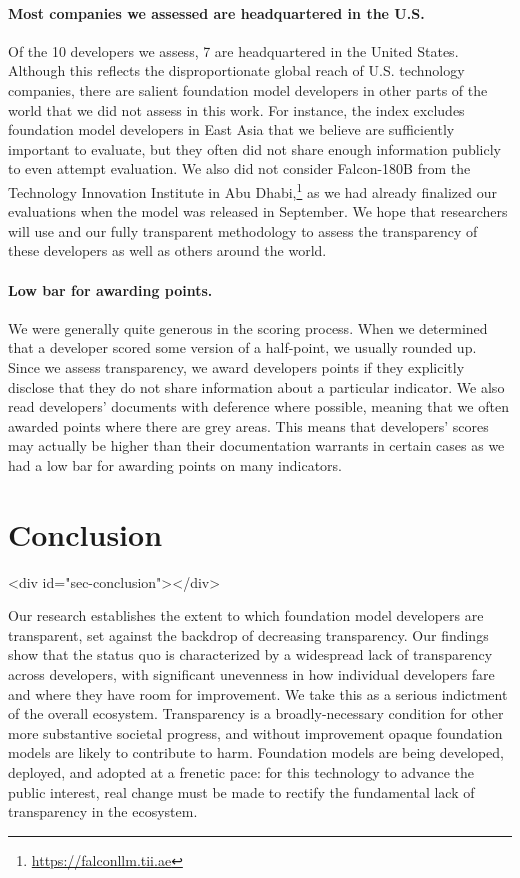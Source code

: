 \documentclass[screen, authorversion, acmsmall]{acmart}
\begin{document}
\paragraph{Most companies we assessed are headquartered in the U.S.}
Of the 10 developers we assess, 7 are headquartered in the United States. 
Although this reflects the disproportionate global reach of U.S. technology companies, there are salient foundation model developers in other parts of the world that we did not assess in this work. 
For instance, the index excludes foundation model developers in East Asia that we believe are sufficiently important to evaluate, but they often did not share enough information publicly to even attempt evaluation.
We also did not consider Falcon-180B from the Technology Innovation Institute in Abu Dhabi,\footnote{\url{https://falconllm.tii.ae}} as we had already finalized our evaluations when the model was released in September. 
We hope that researchers will use \projectname and our fully transparent methodology to assess the transparency of these developers as well as others around the world.

\paragraph{Low bar for awarding points.} 
We were generally quite generous in the scoring process. 
When we determined that a developer scored some version of a half-point, we usually rounded up. 
Since we assess transparency, we award developers points if they explicitly disclose that they do not share information about a particular indicator.
We also read developers' documents with deference where possible, meaning that we often awarded points where there are grey areas.
This means that developers' scores may actually be higher than their documentation warrants in certain cases as we had a low bar for awarding points on many indicators.
\clearpage
\hypertarget{conclusion}{\section{Conclusion}}
<div id="sec-conclusion"></div>

Our research establishes the extent to which foundation model developers are transparent, set against the backdrop of decreasing transparency.
Our findings show that the status quo is characterized by a widespread lack of transparency across developers, with significant unevenness in how individual developers fare and where they have room for improvement.
We take this as a serious indictment of the overall ecosystem.
Transparency is a broadly-necessary condition for other more substantive societal progress, and without improvement opaque foundation models are likely to contribute to harm.
Foundation models are being developed, deployed, and adopted at a frenetic pace: for this technology to advance the public interest, real change must be made to rectify the fundamental lack of transparency in the ecosystem. 
\end{document}
